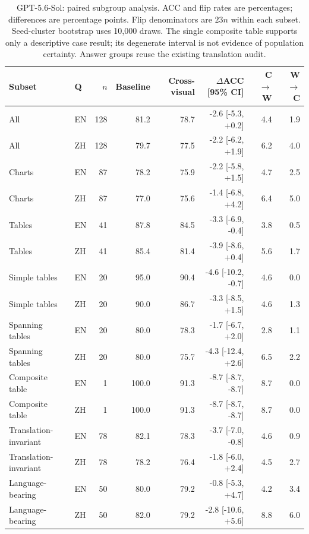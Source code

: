 \begin{table}[t]
\centering\scriptsize
\begin{tabular*}{\textwidth}{@{\extracolsep{\fill}}llrrrrrr@{}}
\toprule
Subset & Q & $n$ & Baseline & Cross-visual & $\Delta$ACC [95\% CI] & C$\to$W & W$\to$C \\
\midrule
All & EN & 128 & 81.2 & 78.7 & -2.6 [-5.3, +0.2] & 4.4 & 1.9 \\
All & ZH & 128 & 79.7 & 77.5 & -2.2 [-6.2, +1.9] & 6.2 & 4.0 \\
Charts & EN & 87 & 78.2 & 75.9 & -2.2 [-5.8, +1.5] & 4.7 & 2.5 \\
Charts & ZH & 87 & 77.0 & 75.6 & -1.4 [-6.8, +4.2] & 6.4 & 5.0 \\
Tables & EN & 41 & 87.8 & 84.5 & -3.3 [-6.9, -0.4] & 3.8 & 0.5 \\
Tables & ZH & 41 & 85.4 & 81.4 & -3.9 [-8.6, +0.4] & 5.6 & 1.7 \\
Simple tables & EN & 20 & 95.0 & 90.4 & -4.6 [-10.2, -0.7] & 4.6 & 0.0 \\
Simple tables & ZH & 20 & 90.0 & 86.7 & -3.3 [-8.5, +1.5] & 4.6 & 1.3 \\
Spanning tables & EN & 20 & 80.0 & 78.3 & -1.7 [-6.7, +2.0] & 2.8 & 1.1 \\
Spanning tables & ZH & 20 & 80.0 & 75.7 & -4.3 [-12.4, +2.6] & 6.5 & 2.2 \\
Composite table & EN & 1 & 100.0 & 91.3 & -8.7 [-8.7, -8.7] & 8.7 & 0.0 \\
Composite table & ZH & 1 & 100.0 & 91.3 & -8.7 [-8.7, -8.7] & 8.7 & 0.0 \\
Translation-invariant & EN & 78 & 82.1 & 78.3 & -3.7 [-7.0, -0.8] & 4.6 & 0.9 \\
Translation-invariant & ZH & 78 & 78.2 & 76.4 & -1.8 [-6.0, +2.4] & 4.5 & 2.7 \\
Language-bearing & EN & 50 & 80.0 & 79.2 & -0.8 [-5.3, +4.7] & 4.2 & 3.4 \\
Language-bearing & ZH & 50 & 82.0 & 79.2 & -2.8 [-10.6, +5.6] & 8.8 & 6.0 \\
\bottomrule\end{tabular*}
\caption{GPT-5.6-Sol: paired subgroup analysis. ACC and flip rates are percentages; differences are percentage points. Flip denominators are $23n$ within each subset. Seed-cluster bootstrap uses 10,000 draws. The single composite table supports only a descriptive case result; its degenerate interval is not evidence of population certainty. Answer groups reuse the existing translation audit.}
\end{table}

